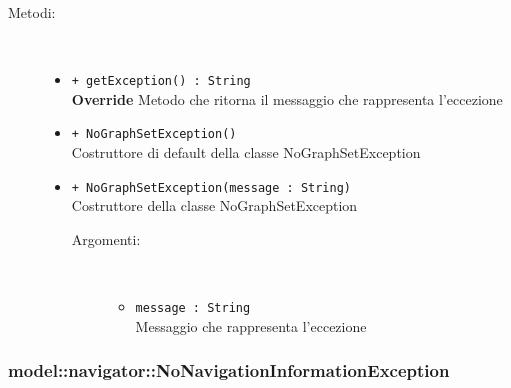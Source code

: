 \documentclass[../DefinizioneDiProdotto.tex]{subfiles}
\begin{document}
\begin{description}
\begin{itemize}
\end{itemize}
\item[Metodi:] \
\begin{itemize}
\item \texttt{+ getException() : String}\\
\textbf{Override} Metodo che ritorna il messaggio che rappresenta l'eccezione
 \item \texttt{+ NoGraphSetException()}\\
Costruttore di default della classe NoGraphSetException
 \item \texttt{+ NoGraphSetException(message : String)}\\
Costruttore della classe NoGraphSetException
 \begin{description}
\item[Argomenti:] \
\begin{itemize}
\item \texttt{message : String}\\
Messaggio che rappresenta l'eccezione\end{itemize}
\end{description}
\end{itemize}
\end{description}

\subsubsection{model::navigator::NoNavigationInformationException}
\end{document}
